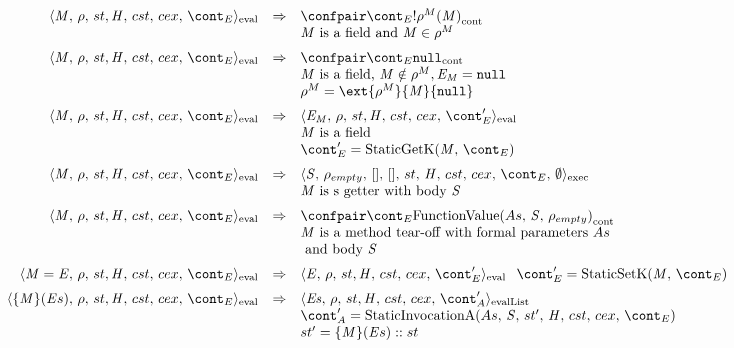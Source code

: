 \documentclass{article}
\newcounter{rowcount}[table]
\newcounter{tablecount}
\newcommand{\myrowcount}{\refstepcounter{rowcount}\thesubsection.\thetablecount.\therowcount}
\newcommand{\labeledrow}[1]{\myrowcount\label{#1}}
\begin{document}
%
%
\begin{center}
	$
	\begin{array}{lrcl}	
		\evalcesktrans
			{\evalconf{\StaticGet{\membermeta}}{\env}{\strace}{\cstrace}{\cex}{\econt}}
			{\contconf{\econt}{\deref{\env^{M}(\membermeta)}}}
			{\\&&&\membermeta\textrm{ is a field and } \membermeta \in \env^{M}}

		\evalcesktrans
			{\evalconf{\StaticGet{\membermeta}}{\env}{\strace}{\cstrace}{\cex}{\econt}}
			{\contconf{\econt}{\tt{null}}}
			{\\&&&\membermeta\textrm{ is a field, } \membermeta \notin \env^{M}, \expressionmeta_{\membermeta} = \tt{null}
			\\&&&\env^{M} = \ext{\env^{M}}{\membermeta}{\tt{null}}}

		\evalcesktrans
			{\evalconf{\StaticGet{\membermeta}}{\env}{\strace}{\cstrace}{\cex}{\econt}}
			{\evalconf{\expressionmeta_{\membermeta}}{\env}{\strace}{\cstrace}{\cex}{\econt'}}
			{\\&&&\membermeta\textrm{ is a field}
			\\&&&\econt' = \StaticGetK}

		\evalcesktrans
			{\evalconf{\StaticGet{\membermeta}}{\env}{\strace}{\cstrace}{\cex}{\econt}}
			{\execconf{\stmt}{\env_{empty}}{[]}{[]}{\handler}{\cstrace}{\cex}{\econt}{\emptyset}}
			{\\&&&\membermeta\textrm{ is s getter with body }\stmt}

		\evalcesktrans
			{\evalconf{\StaticGet{\membermeta}}{\env}{\strace}{\cstrace}{\cex}{\econt}}
			{\contconf{\econt}{\funval{\formals}{\stmt}{\env_{empty}}}}
			{\\&&&\membermeta\textrm{ is a method tear-off with formal parameters }\formals
			\\&&&\textrm{ and body }\stmt}

		\evalcesktrans
			{\evalconf{\StaticSet{\membermeta}{\expressionmeta}}{\env}{\strace}{\cstrace}{\cex}{\econt}}
			{\evalconf{\expressionmeta}{\env}{\strace}{\cstrace}{\cex}{\econt'}}
			{\econt' = \StaticSetK}

		\evalcesktrans
			{\evalconf{\StaticInvocation{\{\membermeta\}}{\expressionsmeta}}{\env}{\strace}{\cstrace}{\cex}{\econt}}
			{\evallistconf{\exprs}{\env}{\strace}{\cstrace}{\cex}{\acont'}}
			{\\&&&\acont' = \StaticInvA{\formals}{\stmt}{\strace'}{\econt}
			\\&&&\strace' = \StaticInvocation{\{\membermeta\}}{\expressionsmeta}::\strace}
	\end{array}
	$
	\label{table:static-evalconfigs}
\end{center}
\end{document}

